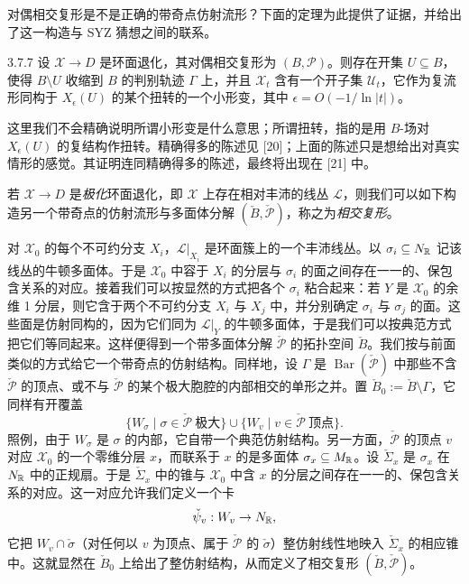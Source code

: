 对偶相交复形是不是正确的带奇点仿射流形？下面的定理为此提供了证据，并给出了这一构造与 SYZ 猜想之间的联系。

\begin{theorem}{3.7.7}
设 $\mathcal X\to D$ 是环面退化，其对偶相交复形为 $(B,\mathcal P)$。则存在开集 $U\subseteq B$，使得 $B\setminus U$ 收缩到 $B$ 的判别轨迹 $\Gamma$ 上，并且 $\mathcal X_t$ 含有一个开子集 $\mathcal U_t$，它作为复流形同构于 $X_\epsilon(U)$ 的某个扭转的一个小形变，其中 $\epsilon=O(-1/\ln|t|)$。
\end{theorem}

这里我们不会精确说明所谓小形变是什么意思；所谓扭转，指的是用 $B$-场对 $X_\epsilon(U)$ 的复结构作扭转。精确得多的陈述见 [20]；上面的陈述只是想给出对真实情形的感觉。其证明连同精确得多的陈述，最终将出现在 [21] 中。

若 $\mathcal X\to D$ 是\emph{极化}环面退化，即 $\mathcal X$ 上存在相对丰沛的线丛 $\mathcal L$，则我们可以如下构造另一个带奇点的仿射流形与多面体分解 $(\check B,\check{\mathcal P})$，称之为\emph{相交复形}。

对 $\mathcal X_0$ 的每个不可约分支 $X_i$，$\mathcal L|_{X_i}$ 是环面簇上的一个丰沛线丛。以 $\sigma_i\subseteq N_{\mathbb{R}}$ 记该线丛的牛顿多面体。于是 $\mathcal X_0$ 中容于 $X_i$ 的分层与 $\sigma_i$ 的面之间存在一一的、保包含关系的对应。接着我们可以按显然的方式把各个 $\sigma_i$ 粘合起来：若 $Y$ 是 $\mathcal X_0$ 的余维 1 分层，则它含于两个不可约分支 $X_i$ 与 $X_j$ 中，并分别确定 $\sigma_i$ 与 $\sigma_j$ 的面。这些面是仿射同构的，因为它们同为 $\mathcal L|_Y$ 的牛顿多面体，于是我们可以按典范方式把它们等同起来。这样便得到一个带多面体分解 $\check{\mathcal P}$ 的拓扑空间 $\check B$。我们按与前面类似的方式给它一个带奇点的仿射结构。同样地，设 $\Gamma$ 是 $\operatorname{Bar}(\check{\mathcal P})$ 中那些不含 $\check{\mathcal P}$ 的顶点、或不与 $\check{\mathcal P}$ 的某个极大胞腔的内部相交的单形之并。置 $\check B_0:=\check B\setminus\Gamma$，它同样有开覆盖
\[
\{W_\sigma\mid\sigma\in\check{\mathcal P}\ \text{极大}\}\cup\{W_v\mid v\in\check{\mathcal P}\ \text{顶点}\}.
\]
照例，由于 $W_\sigma$ 是 $\sigma$ 的内部，它自带一个典范仿射结构。另一方面，$\check{\mathcal P}$ 的顶点 $v$ 对应 $\mathcal X_0$ 的一个零维分层 $x$，而联系于 $x$ 的是多面体 $\sigma_x\subseteq M_{\mathbb{R}}$。设 $\check\Sigma_x$ 是 $\sigma_x$ 在 $N_{\mathbb{R}}$ 中的正规扇。于是 $\check\Sigma_x$ 中的锥与 $\mathcal X_0$ 中含 $x$ 的分层之间存在一一的、保包含关系的对应。这一对应允许我们定义一个卡
\[
\check\psi_v:W_v\to N_{\mathbb{R}},
\]
它把 $W_v\cap\check\sigma$（对任何以 $v$ 为顶点、属于 $\check{\mathcal P}$ 的 $\check\sigma$）整仿射线性地映入 $\check\Sigma_x$ 的相应锥中。这就显然在 $\check B_0$ 上给出了整仿射结构，从而定义了相交复形 $(\check B,\check{\mathcal P})$。

